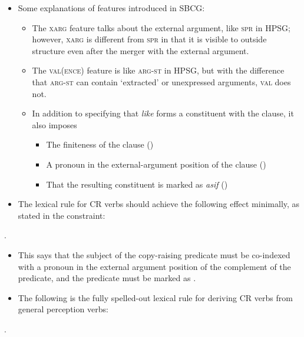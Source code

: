 \documentclass[11pt]{article}
\begin{document}
\begin{itemize}
  \item Some explanations of features introduced in SBCG:
    \begin{itemize}
      \item  The \textsc{xarg} feature talks about the external argument, like \textsc{spr} in HPSG; however, \textsc{xarg} is different from \textsc{spr} in that it is visible to outside structure even after the merger with the external argument.
      \item The \textsc{val(ence)} feature is like \textsc{arg-st} in HPSG, but with the difference that \textsc{arg-st} can contain `extracted' or unexpressed arguments, \textsc{val} does not.
      \item In addition to specifying that \emph{like} forms a constituent with the clause, it also imposes 
        \begin{itemize}
          \item The finiteness of the clause ()
          \item A pronoun in the external-argument position of the clause (\avm{[xarg & NP]})
          \item That the resulting constituent is marked as \emph{asif} ()
        \end{itemize}
    \end{itemize}
  \item The lexical rule for CR verbs should achieve the following effect minimally, as stated in the constraint:
\end{itemize}
\ex. 

\begin{itemize}
  \item This says that the subject of the copy-raising predicate must be co-indexed with a pronoun in the external argument position of the complement of the predicate, and the predicate must be marked as .
  \item The following is the fully spelled-out lexical rule for deriving CR verbs from general perception verbs:
\end{itemize}
\ex. 
\end{document}
